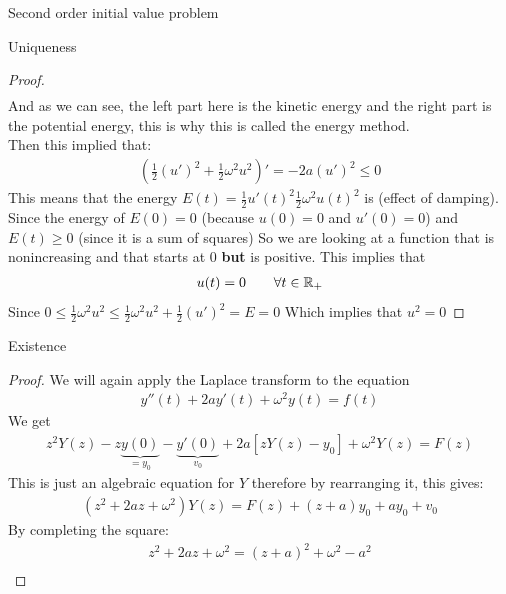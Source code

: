 \begin{parag}{Second order initial value problem}
\begin{subparag}{Uniqueness}
\begin{proof}
\begin{align*}
				\end{align*}
				And as we can see, the left part here is the kinetic energy and the right part is the potential energy, this is why this is called the energy method.\\
				Then this implied that:
				\begin{align*} 
					\left(\frac{1}{2}\left(u'\right)^2  + \frac{1}{2}\omega^2 u^2\right)' =  -2a \left(u'\right)^2 \leq 0
				\end{align*}
				This means that the energy $E\left(t\right) = \frac{1}{2}u'\left(t\right)^2 \frac{1}{2}\omega^2 u\left(t\right)^2$ is  (effect of damping). Since the energy of $E\left(0\right) = 0$ (because $u\left(0\right) =  0$ and $u'\left(0\right) = 0$) and $E\left(t\right) \geq 0$ (since it is a sum of squares) So we are looking at a function that is nonincreasing and that starts at $0$  \textbf{but} is positive. This implies that 
				\begin{align*} 
					u\left(t\right) = 0 \mathspace \mathspace \forall t \in \mathbb{R}_+
				\end{align*}
				Since $0\leq \frac{1}{2}\omega^2 u^2 \leq \frac{1}{2}\omega^2u^2 + \frac{1}{2}\left(u'\right)^2 = E = 0$ Which implies that $u^2 = 0$
		    \end{proof}
		\end{subparag}
		\begin{subparag}{Existence}
		    \begin{proof}
		        We will again apply the Laplace transform to the equation 
		        \begin{align*} 
					y''\left(t\right) + 2ay'\left(t\right) + \omega^2 y\left(t\right) = f\left(t\right)
				\end{align*}
				We get 
				\begin{align*} 
					z^2Y\left(z\right) - z\underbrace{y\left(0\right)}_{= y_0} - \underbrace{y'\left(0\right)}_{v_0} + 2a \left[zY\left(z\right) - y_0\right] + \omega^2 Y\left(z\right) =  F\left(z\right)
				\end{align*}
				This is just an algebraic equation for $Y$ therefore by rearranging it, this gives:
				\begin{align*} 
					\left(z^2 + 2az + \omega^2\right)Y\left(z\right) =  F\left(z\right) + \left(z + a\right)y_0 + ay_0 + v_0
				\end{align*}
				By completing the square:
				\begin{align*} 
					z^2 + 2az + \omega^2 = \left(z + a\right)^2 + \omega^2 - a^2 \\

\end{align*}
\end{proof}
\end{subparag}
\end{parag}
